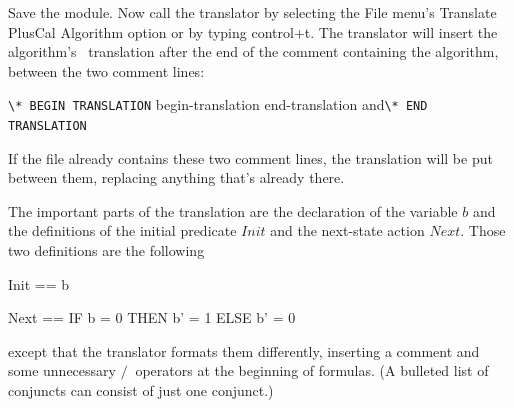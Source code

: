 %
Save the module.  Now 
call the translator by selecting the \textsf{File} menu's
\textsf{Translate PlusCal Algorithm} option or by typing
\textsf{control+t}.  The translator will insert the algorithm's
\tlaplus\ translation after the end of the comment containing the
algorithm, between the two comment lines:
\begin{display}
\verb|\* BEGIN TRANSLATION|  
  {begin-translation}%
  {end-translation}%
and\verb|\* END TRANSLATION|
\end{display}
If the file already contains these two comment lines, the translation
will be put between them, replacing anything that's already there.

The important parts of the translation are the declaration
of the variable $b$ and the definitions of the initial predicate
$Init$ and the next-state action $Next$.  Those two definitions are
the following
\begin{display}
\begin{notla}
Init == b 

Next == IF b = 0 THEN  b' = 1
                 ELSE  b' = 0
\end{notla}
\begin{tlatex}
%
\par\vspace{8.0pt}%
%
%
\end{tlatex}
\end{display}
except that the translator formats them differently, inserting a
comment and some unnecessary $/\ $ operators at the beginning of
formulas.  (A bulleted list of conjuncts can consist of just one
conjunct.)

